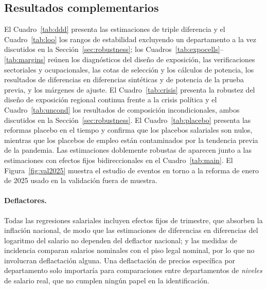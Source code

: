 \subsection{Resultados complementarios}

El Cuadro~\ref{tab:ddd} presenta las estimaciones de triple diferencia y el Cuadro~\ref{tab:loo} los rangos de estabilidad excluyendo un departamento a la vez discutidos en la Sección~\ref{sec:robustness}; los Cuadros~\ref{tab:expocells}--\ref{tab:margins} reúnen los diagnósticos del diseño de exposición, las verificaciones sectoriales y ocupacionales, las cotas de selección y los cálculos de potencia, los resultados de diferencias en diferencias sintéticas y de potencia de la prueba previa, y los márgenes de ajuste. El Cuadro~\ref{tab:crisis} presenta la robustez del diseño de exposición regional continua frente a la crisis política y el Cuadro~\ref{tab:uncond} los resultados de composición incondicionales, ambos discutidos en la Sección~\ref{sec:robustness}. El Cuadro~\ref{tab:placebo} presenta las reformas placebo en el tiempo y confirma que los placebos salariales son nulos, mientras que los placebos de empleo están contaminados por la tendencia previa de la pandemia. Las estimaciones doblemente robustas de \citet{santanna_zhao_2020} aparecen junto a las estimaciones con efectos fijos bidireccionales en el Cuadro~\ref{tab:main}. El Figura~\ref{fig:val2025} muestra el estudio de eventos en torno a la reforma de enero de 2025 usado en la validación fuera de muestra.





















\paragraph{Deflactores.} Todas las regresiones salariales incluyen efectos fijos de trimestre, que absorben la inflación nacional, de modo que las estimaciones de diferencias en diferencias del logaritmo del salario no dependen del deflactor nacional; y las medidas de incidencia comparan salarios nominales con el piso legal nominal, por lo que no involucran deflactación alguna. Una deflactación de precios específica por departamento solo importaría para comparaciones entre departamentos de \emph{niveles} de salario real, que no cumplen ningún papel en la identificación.

